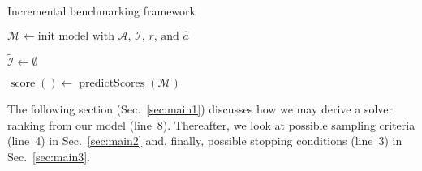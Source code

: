 \documentclass[runningheads]{llncs}
\begin{document}
\begin{algorithm}
  \caption{Incremental benchmarking framework}
  \label{algALBenchmark}


  $\mathcal{M} \leftarrow \textrm{init model with $\mathcal{A}$, $\mathcal{I}$, $r$, and $\hat{a}$}$
  
  $\tilde{\mathcal{I}} \leftarrow \emptyset$


  $\operatorname{score}\!\left(\right) \leftarrow \operatorname{predictScores}\!\left(\mathcal{M}\right)$

\end{algorithm}

The following section (Sec.~\ref{sec:main1}) discusses how we may derive a solver ranking from our model (line~8).
Thereafter, we look at possible sampling criteria (line~4) in Sec.~\ref{sec:main2} and, finally, possible stopping conditions (line~3) in Sec.~\ref{sec:main3}.
\end{document}
